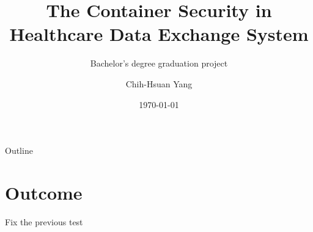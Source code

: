 \documentclass{beamer}
\title{The Container Security in Healthcare Data Exchange System}
\subtitle{Bachelor's degree graduation project}
\author{Chih-Hsuan Yang}
\institute{National Sun Yat-sen University\\
Advisor: Chun-I Fan
}
\date{\today}
\begin{document}
\begin{CJK*}{UTF8}{bsmi}

    \begin{frame}
        \titlepage
    \end{frame}

    \begin{frame}{Outline}
        \begin{multicols}{2}
            \tableofcontents
        \end{multicols}
    \end{frame}


    \section{Outcome}

     {
      
     }

    \begin{frame}
        \Huge \centering
        Fix the previous test
    \end{frame}

    {
    
    }


\end{CJK*}
\end{document}
